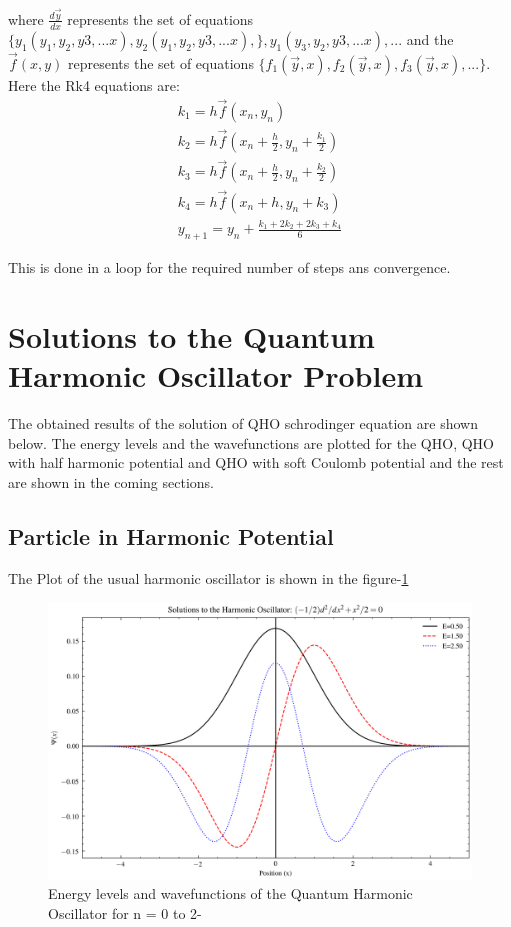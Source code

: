 \documentclass{article}
\begin{document}
\begin{multicols}{2}
where $\frac{d\vec{y}}{dx}$ represents the set of equations $\{ y_1(y_1,y_2,y3,...x) ,y_2(y_1,y_2,y3,...x) , \},y_1(y_3,y_2,y3,...x),...$  and the $\vec{f}(x,y)$ represents the set of equations $\{ f_1(\vec{y},x),f_2(\vec{y},x),f_3(\vec{y},x),... \}$. Here the Rk4 equations are:
\begin{eqnarray}
    k_1 = h\vec{f}(x_n,y_n)\\
    k_2 = h\vec{f}(x_n + \frac{h}{2},y_n + \frac{k_1}{2})\\
    k_3 = h\vec{f}(x_n + \frac{h}{2},y_n + \frac{k_2}{2})\\
    k_4 = h\vec{f}(x_n + h,y_n + k_3)\\
    y_{n+1} = y_n + \frac{k_1 + 2k_2 + 2k_3 + k_4}{6}
\end{eqnarray}

This is done in a loop for the required number of steps ans convergence. 
\section{\label{observations}Solutions to the Quantum Harmonic Oscillator Problem}


The obtained results of the solution of QHO schrodinger equation are shown below. The energy levels and the wavefunctions are plotted for the QHO, QHO with half harmonic potential and QHO with soft Coulomb potential and the rest are shown in the coming sections.


\subsection{\label{QHO_1}Particle in Harmonic Potential}

The Plot of the usual harmonic oscillator is shown in the figure-\ref{usualqho}


\begin{figure}[H]
    \centering
    \includegraphics[width = \columnwidth]{Images/usual_QHO.png}
    \caption{Energy levels and wavefunctions of the Quantum Harmonic Oscillator for n = 0 to 2-\cite{python}}
    \label{usualqho}
\end{figure}


\end{multicols}
\end{document}
